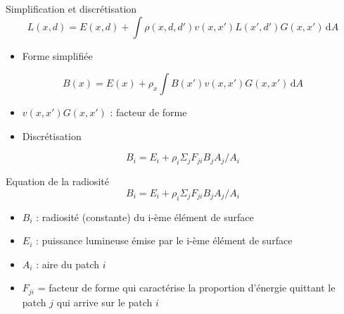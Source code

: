 \begin{frame}{Simplification et discrétisation}
    $$
    L(x,d) = E(x,d) + \int \rho(x,d,d')v(x,x')L(x',d')G(x,x')  \,\mathrm{d}A 
    $$

    \begin{itemize}
        \item Forme simplifiée 
    \end{itemize}

    $$
    B(x) = E(x) + \rho_x \int B(x') v(x,x') G(x,x') \,\mathrm{d}A 
    $$

    \begin{itemize}
        \item $v(x,x') G(x,x')$ : facteur de forme 
        \item Discrétisation 
    \end{itemize}

    $$
    B_i = E_i + \rho_i \Sigma_j F_{ji} B_j A_j/A_i
    $$

\end{frame}

\begin{frame}{Equation de la radiosité}
    $$
    B_i = E_i + \rho_i \Sigma_j F_{ji} B_j A_j/A_i
    $$

    \begin{itemize}
        \item $B_i$ : radiosité (constante) du i-ème élément de surface
        \item $E_i$ : puissance lumineuse émise par le i-ème élément de surface
        \item $A_i$ : aire du patch $i$
        \item $F_{ji}$ = facteur de forme qui caractérise la proportion d'énergie quittant le patch $j$ qui arrive sur le patch $i$
    \end{itemize}
\end{frame}

